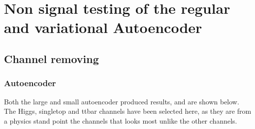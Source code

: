 \section{Non signal testing of the regular and variational Autoencoder}

\subsection*{Channel removing}
\subsubsection*{Autoencoder}
Both the large and small autoencoder produced results, and are shown below. The Higgs, singletop and ttbar channels have been selected here, as they are 
from a physics stand point the channels that looks most unlike the other channels.  


